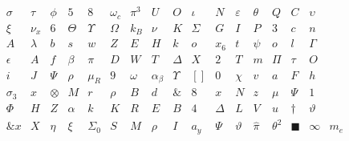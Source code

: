 \documentclass{article}
\begin{document}
\[
\begin{array}{cccccccccccccccc}
\sigma & \tau & \phi & 5 & 8 & \omega_c & \pi^3 & U & O & \iota & N & \varepsilon & \theta  & Q & C & \upsilon \\
\xi & \nu_{x} & 6 & \Theta & \Upsilon & \Omega & k_B & \nu & K & \Sigma & G & I & P & 3 & c & n \\
A & \lambda & b & s & w & Z & E & H & k & o & x_6 & t & \psi & o & l & \Gamma \\
\epsilon & A & f & \beta & \pi & D & W & T & \Delta & X & 2 & T & m & \Pi & \tau & O \\
i & J & \Psi & \rho & \mu_R & 9 & \omega & \alpha_{\beta} & \Upsilon & \left[ \right] & 0 & \chi & v & a & F & h \\
\sigma_3 & x & \otimes & M & r & \rho & B & d & \& & 8 & x & N & z & \mu & \Psi & 1 \\
\Phi & H & Z & \alpha & k & K & R & E & B & 4 & \Delta & L & V & u & \dagger & \vartheta \\
\&x & X & \eta & \xi & \Sigma_0 & S & M & \rho & I & a_y & \Psi & \vartheta & \hat{\pi} & \theta^2 & \blacksquare & \infty & m_e \\
\end{array}
\]
\end{document}
